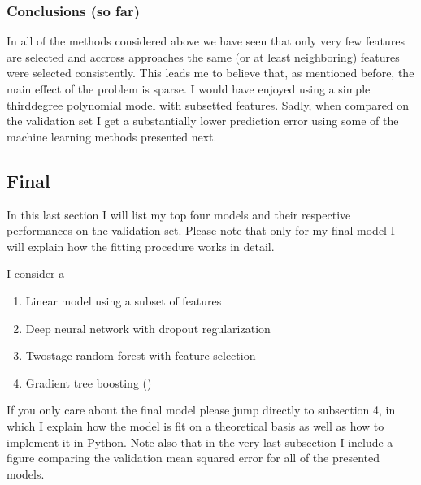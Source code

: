 \documentclass[letterpaper,10pt,english]{sphinxmanual}
\begin{document}
\subsubsection{Conclusions  (so far)}
\label{\detokenize{simulated_reverse_engineering:conclusions-so-far}}
In all of the methods considered above we have seen that only very few features are selected and accross approaches the same (or at least neighboring) features were selected consistently. This leads me to believe that, as mentioned before, the main effect of the problem is sparse. I would have enjoyed using a simple third\sphinxhyphen{}degree polynomial model with subsetted features. Sadly, when compared on the validation set I get a substantially lower prediction error using some of the machine learning methods presented next.


\subsection{Final}
\label{\detokenize{simulated_final:final}}\label{\detokenize{simulated_final::doc}}
In this last section I will list my top four models and their respective performances on the validation set. Please note that only for my final model I will explain how the fitting procedure works in detail.

I consider a
\begin{enumerate}
%
\item {} 
Linear model using a subset of features

\item {} 
Deep neural network with dropout regularization

\item {} 
Two\sphinxhyphen{}stage random forest with feature selection

\item {} 
Gradient tree boosting ()

\end{enumerate}

If you only care about the final model please jump directly to subsection 4, in which I explain how the model is fit on a theoretical basis as well as how to implement it in Python. Note also that in the very last subsection I include a figure comparing the validation mean squared error for all of the presented models.
\end{document}
